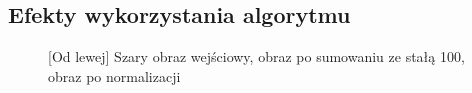 \documentclass[a4paper,12pt, titlepage]{report}
\begin{document}
\subsection*{Efekty wykorzystania algorytmu}
\begin{figure}[h]
    \centering
    \caption{[Od lewej] Szary obraz wejściowy, obraz po sumowaniu ze stałą 100, obraz po normalizacji}%
    \label{fig:geo_after_grey1}%
\end{figure}
\FloatBarrier
\end{document}
